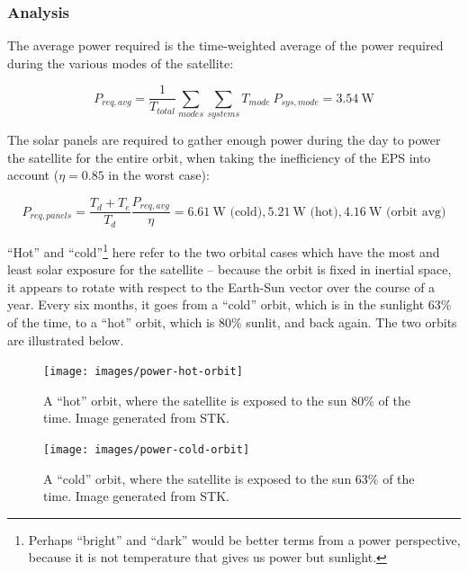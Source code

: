 \documentclass[12pt]{article}
\begin{document}
			\subsubsection{Analysis}\label{subsubsec:power-analysis}
			
The average power required is the time-weighted average of the power required during the various modes of the satellite:

\begin{equation}
P_{req,avg} = \frac{1}{T_{total}}\sum_{modes}{ \sum_{systems}{T_{mode} \: P_{sys,mode}} } = 3.54 \ \text{W} 
\label{eq:power-required}
\end{equation}

The solar panels are required to gather enough power during the day to power the satellite for the entire orbit, when taking the inefficiency of the EPS into account ($\eta = 0.85$ in the worst case\cite{EPS-manual}):

\begin{equation}
P_{req,panels} = \frac{T_d + T_e}{T_d}\frac{P_{req,avg}}{\eta} = 6.61 \ \text{W (cold)}, 5.21 \ \text{W (hot)}, 4.16 \ \text{W (orbit avg)}
\label{eq:power-required-panels}
\end{equation}

``Hot'' and ``cold''\footnote{Perhaps ``bright'' and ``dark'' would be better terms from a power perspective, because it is not temperature that gives us power but sunlight.} here refer to the two orbital cases which have the most and least solar exposure for the satellite – because the orbit is fixed in inertial space, it appears to rotate with respect to the Earth-Sun vector over the course of a year.  Every six months, it goes from a “cold” orbit, which is in the sunlight 63\% of the time, to a “hot” orbit, which is 80\% sunlit, and back again.  The two orbits are illustrated below.

\begin{figure}[ht]%
\centering
\texttt{[image: images/power-hot-orbit]}%
\caption{A ``hot'' orbit, where the satellite is exposed to the sun 80\% of the time.  Image generated from STK.}%
\label{fig:power-hot-orbit}%
\end{figure}

\begin{figure}[ht]%
\centering
\texttt{[image: images/power-cold-orbit]}%
\caption{A ``cold'' orbit, where the satellite is exposed to the sun 63\% of the time.  Image generated from STK.}%
\label{fig:power-cold-orbit}%
\end{figure}
\end{document}
